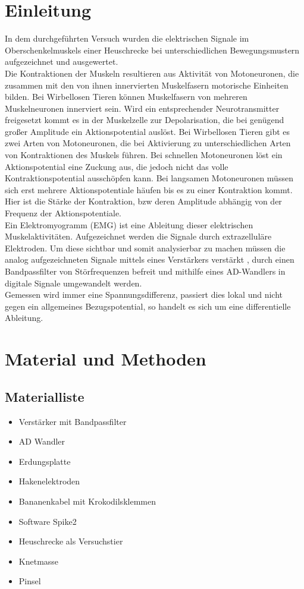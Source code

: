 \section{Einleitung}
In dem durchgeführten Versuch wurden die elektrischen Signale im Oberschenkelmuskels einer Heuschrecke bei unterschiedlichen Bewegungsmustern aufgezeichnet und ausgewertet.\\
Die Kontraktionen der Muskeln resultieren aus Aktivität von Motoneuronen, die zusammen mit den von ihnen innervierten Muskelfasern motorische Einheiten bilden. Bei Wirbellosen Tieren können Muskelfasern von mehreren Muskelneuronen innerviert sein. Wird ein entsprechender Neurotransmitter freigesetzt kommt es in der Muskelzelle zur Depolarisation, die bei genügend großer Amplitude ein Aktionspotential auslöst. Bei Wirbellosen Tieren gibt es zwei Arten von Motoneuronen, die bei Aktivierung zu unterschiedlichen Arten von Kontraktionen des Muskels führen. Bei schnellen Motoneuronen löst ein Aktionspotential eine Zuckung aus, die jedoch nicht das volle Kontraktionspotential ausschöpfen kann. Bei langsamen Motoneuronen müssen sich erst mehrere Aktionspotentiale häufen bis es zu einer Kontraktion kommt. Hier ist die Stärke der Kontraktion, bzw deren Amplitude abhängig von der Frequenz der Aktionspotentiale.\\
Ein Elektromyogramm (EMG) ist eine Ableitung dieser elektrischen Muskelaktivitäten. Aufgezeichnet werden die Signale durch extrazelluläre Elektroden. Um diese sichtbar und somit analysierbar zu machen müssen die analog aufgezeichneten Signale mittels eines Verstärkers verstärkt , durch einen Bandpassfilter von Störfrequenzen befreit und mithilfe eines AD-Wandlers in digitale Signale umgewandelt werden.\\
Gemessen wird immer eine Spannungsdifferenz, passiert dies lokal und nicht gegen ein allgemeines Bezugspotential, so handelt es sich um eine differentielle Ableitung.

\section{Material und Methoden}

\subsection{Materialliste}
\begin{itemize}
\item Verstärker mit Bandpassfilter
\item AD Wandler
\item Erdungsplatte
\item Hakenelektroden
\item Bananenkabel mit Krokodilsklemmen
\item Software Spike2
\item Heuschrecke als Versuchstier 
\item Knetmasse
\item Pinsel
\end{itemize}
